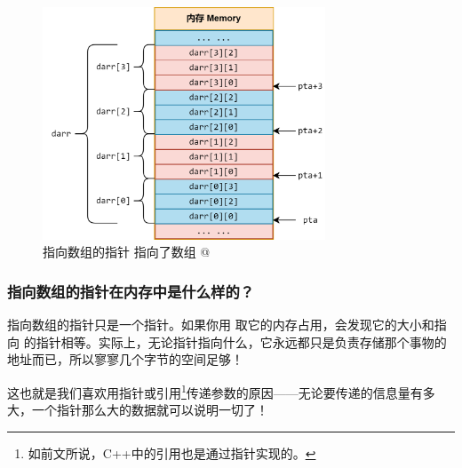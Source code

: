 \begin{figure}[htbp]
    \centering
    \includegraphics[width=0.75\textwidth]{../images/generalized_parts/05_the_pointer_to_array_and_2d_array.drawio.png}
    \caption{指向数组的指针 \lstinline@pta@ 指向了数组 \lstinline@darr[0]@}
\end{figure}
\subsubsection*{指向数组的指针在内存中是什么样的？}
指向数组的指针只是一个指针。如果你用 \lstinline@sizeof@ 取它的内存占用，会发现它的大小和指向 \lstinline@int@ 的指针相等。实际上，无论指针指向什么，它永远都只是负责存储那个事物的地址而已，所以寥寥几个字节的空间足够！\par
这也就是我们喜欢用指针或引用\footnote{如前文所说，C++中的引用也是通过指针实现的。}传递参数的原因——无论要传递的信息量有多大，一个指针那么大的数据就可以说明一切了！\par
